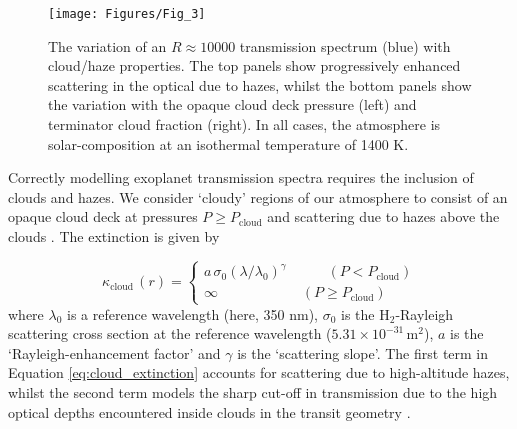 \documentclass[fleqn,usenatbib]{mnras}
\begin{document}
\begin{figure*}
	\texttt{[image: Figures/Fig\_3]}
    \caption{The variation of an $R \approx 10000$ transmission spectrum (blue) with cloud/haze properties. The top panels show progressively enhanced scattering in the optical due to hazes, whilst the bottom panels show the variation with the opaque cloud deck pressure (left) and terminator cloud fraction (right). In all cases, the atmosphere is solar-composition at an isothermal temperature of 1400 K.}
    \label{fig:cloud_parameters}
\end{figure*}

Correctly modelling exoplanet transmission spectra requires the inclusion of clouds and hazes. We consider `cloudy' regions of our atmosphere to consist of an opaque cloud deck at pressures $P \geq P_{\mathrm{cloud}}$ and scattering due to hazes above the clouds  \citep{Etangs2008}. The extinction is given by

%
\begin{equation}
\kappa_{\mathrm{\mathrm{cloud}}} \, (r)=
\left\{
\begin{array}{ll}
    a \, \sigma_{0} (\lambda/\lambda_{0})^{\gamma}  \hspace{35pt} (P < P_{\mathrm{cloud}}) \\
    \infty        \hspace{72pt} (P \geq P_{\mathrm{cloud}}) 
\end{array}
\right.
\label{eq:cloud_extinction}
\end{equation}
%
where $\lambda_0$ is a reference wavelength (here, 350 nm), $\sigma_0$ is the $\mathrm{H}_2$-Rayleigh scattering cross section at the reference wavelength ($5.31 \times 10^{-31} \, \mathrm{{m}^2}$), $a$ is the `Rayleigh-enhancement factor' and $\gamma$ is the `scattering slope'. The first term in Equation \ref{eq:cloud_extinction} accounts for scattering due to high-altitude hazes, whilst the second term models the sharp cut-off in transmission due to the high optical depths encountered inside clouds in the transit geometry \citep{Fortney2005}.
\end{document}
